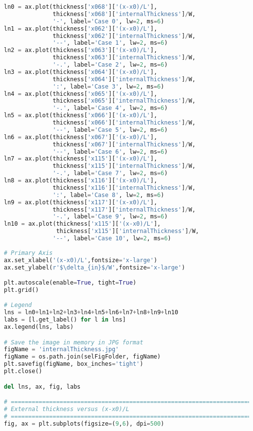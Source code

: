 \begin{lstlisting}[language=python]
ln0 = ax.plot(thickness['x068']['(x-x0)/L'],
              thickness['x068']['internalThickness']/W,
              '-', label='Case 0', lw=2, ms=6)
ln1 = ax.plot(thickness['x062']['(x-x0)/L'],
              thickness['x062']['internalThickness']/W,
              '--', label='Case 1', lw=2, ms=6)
ln2 = ax.plot(thickness['x063']['(x-x0)/L'],
              thickness['x063']['internalThickness']/W,
              '-.', label='Case 2', lw=2, ms=6)
ln3 = ax.plot(thickness['x064']['(x-x0)/L'],
              thickness['x064']['internalThickness']/W,
              ':', label='Case 3', lw=2, ms=6)
ln4 = ax.plot(thickness['x065']['(x-x0)/L'],
              thickness['x065']['internalThickness']/W,
              '-.', label='Case 4', lw=2, ms=6)
ln5 = ax.plot(thickness['x066']['(x-x0)/L'],
              thickness['x066']['internalThickness']/W,
              '--', label='Case 5', lw=2, ms=6)
ln6 = ax.plot(thickness['x067']['(x-x0)/L'],
              thickness['x067']['internalThickness']/W,
              '--', label='Case 6', lw=2, ms=6)
ln7 = ax.plot(thickness['x115']['(x-x0)/L'],
              thickness['x115']['internalThickness']/W,
              '-.', label='Case 7', lw=2, ms=6)
ln8 = ax.plot(thickness['x116']['(x-x0)/L'],
              thickness['x116']['internalThickness']/W,
              ':', label='Case 8', lw=2, ms=6)
ln9 = ax.plot(thickness['x117']['(x-x0)/L'],
              thickness['x117']['internalThickness']/W,
              '-.', label='Case 9', lw=2, ms=6)
ln10 = ax.plot(thickness['x115']['(x-x0)/L'],
               thickness['x115']['internalThickness']/W,
              '--', label='Case 10', lw=2, ms=6)
    
# Primary Axis
ax.set_xlabel('(x-x0)/L',fontsize='x-large')
ax.set_ylabel(r'$\delta_{in}$/W',fontsize='x-large')

plt.autoscale(enable=True, tight=True)
plt.grid()

# Legend
lns = ln0+ln1+ln2+ln3+ln4+ln5+ln6+ln7+ln8+ln9+ln10
labs = [l.get_label() for l in lns]
ax.legend(lns, labs)

# Save the image in memory in JPG format
figName = 'internalThickness.jpg'
figName = os.path.join(selFigFolder, figName)
plt.savefig(figName, box_inches='tight')
plt.close()

del lns, ax, fig, labs

# =============================================================================
# External thickness versus (x-x0)/L
# =============================================================================
fig, ax = plt.subplots(figsize=(9,6), dpi=500)


\end{lstlisting}
